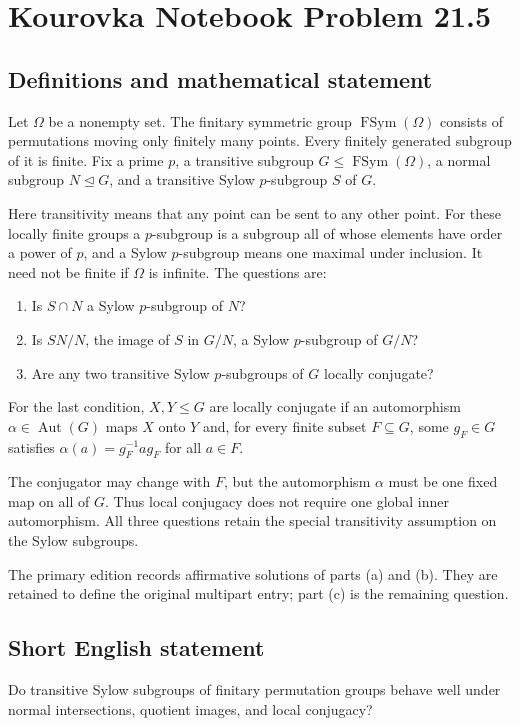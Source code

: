 \documentclass[11pt,a4paper]{article}
\begin{document}
\section*{Kourovka Notebook Problem 21.5}\label{statement}

\subsection{Definitions and mathematical statement}
Let $\Omega$ be a nonempty set. The finitary symmetric group
$\operatorname{FSym}(\Omega)$ consists of permutations moving only finitely
many points. Every finitely generated subgroup of it is finite.
Fix a prime $p$, a transitive subgroup $G\le\operatorname{FSym}(\Omega)$,
a normal subgroup $N\trianglelefteq G$, and a transitive Sylow
$p$-subgroup $S$ of $G$.

Here transitivity means that any point can be sent to any other point.
For these locally finite groups a $p$-subgroup is a subgroup all of whose
elements have order a power of $p$, and a Sylow $p$-subgroup means one
maximal under inclusion. It need not be finite if $\Omega$ is infinite.
The questions are:
\begin{enumerate}
\item Is $S\cap N$ a Sylow $p$-subgroup of $N$?
\item Is $SN/N$, the image of $S$ in $G/N$, a Sylow $p$-subgroup of $G/N$?
\item Are any two transitive Sylow $p$-subgroups of $G$ locally conjugate?
\end{enumerate}
For the last condition, $X,Y\le G$ are locally conjugate if an
automorphism $\alpha\in\operatorname{Aut}(G)$ maps $X$ onto $Y$ and,
for every finite subset $F\subseteq G$, some $g_F\in G$ satisfies
$\alpha(a)=g_F^{-1}ag_F$ for all $a\in F$.

The conjugator may change with $F$, but the automorphism $\alpha$ must
be one fixed map on all of $G$. Thus local conjugacy does not require
one global inner automorphism. All three questions retain the special
transitivity assumption on the Sylow subgroups.

The primary edition records affirmative solutions of parts (a) and (b).
They are retained to define the original multipart entry; part (c) is
the remaining question.
\subsection{Short English statement}
Do transitive Sylow subgroups of finitary permutation groups behave well under normal intersections, quotient images, and local conjugacy?
\end{document}
